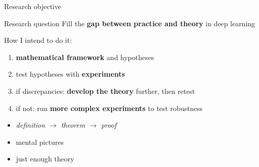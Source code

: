 \documentclass{beamer}
\begin{document}
\begin{frame}{Research objective}
    \begin{block}{Research question}
       Fill the {\bf gap between practice and theory} in deep learning  
    \end{block}
\bigskip\pause
How I intend to do it:
\begin{enumerate}
    \item {\bf mathematical framework} and hypotheses
    \item test hypotheses with {\bf experiments}
    \item if discrepancies: {\bf develop the theory} further, then retest
    \item if not: run {\bf more complex experiments} to test robustness
\end{enumerate}
    \bigskip\pause
\begin{itemize} 
    \item {\it definition $\rightarrow$ theorem $\rightarrow$ proof}~\cite{weinan,berner}
    \item mental pictures 
    \item just enough theory
\end{itemize}
\end{frame}
\end{document}
